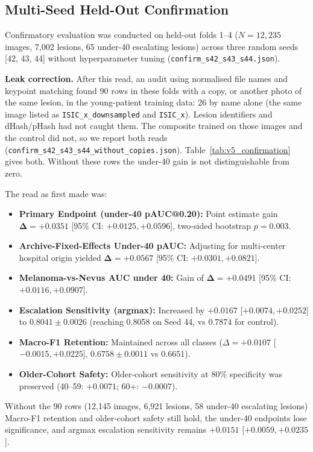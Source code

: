 \documentclass[journal]{IEEEtran}
\newcommand{\uforty}{under-40}
\begin{document}
\subsection{Multi-Seed Held-Out Confirmation}\label{sec:confirmation}
Confirmatory evaluation was conducted on held-out folds 1--4 ($N = 12,235$ images, 7,002 lesions, 65 \uforty{} escalating lesions) across three random seeds [42, 43, 44] without hyperparameter tuning (\texttt{confirm\_s42\_s43\_s44.json}).

\textbf{Leak correction.} After this read, an audit using normalised file names and keypoint matching found 90 rows in these folds with a copy, or another photo of the same lesion, in the young-patient training data: 26 by name alone (the same image listed as \texttt{ISIC\_x\_downsampled} and \texttt{ISIC\_x}). Lesion identifiers and dHash/pHash had not caught them. The composite trained on those images and the control did not, so we report both reads (\texttt{confirm\_s42\_s43\_s44\_without\_copies.json}). Table~\ref{tab:v5_confirmation} gives both. Without these rows the \uforty{} gain is not distinguishable from zero.

The read as first made was:
\begin{itemize}
\item \textbf{Primary Endpoint (\uforty{} pAUC@0.20):} Point estimate gain $\mathbf{\Delta = +0.0351}$ [95\% CI: $+0.0125, +0.0596$], two-sided bootstrap $p = 0.003$.
\item \textbf{Archive-Fixed-Effects Under-40 pAUC:} Adjusting for multi-center hospital origin yielded $\mathbf{\Delta = +0.0567}$ [95\% CI: $+0.0301, +0.0821$].
\item \textbf{Melanoma-vs-Nevus AUC under 40:} Gain of $\mathbf{\Delta = +0.0491}$ [95\% CI: $+0.0116, +0.0907$].
\item \textbf{Escalation Sensitivity (argmax):} Increased by $+0.0167$ [$+0.0074, +0.0252$] to $0.8041 \pm 0.0026$ (reaching 0.8058 on Seed 44, vs $0.7874$ for control).
\item \textbf{Macro-F1 Retention:} Maintained across all classes ($\Delta = +0.0107$ [$-0.0015, +0.0225$], $0.6758 \pm 0.0011$ vs $0.6651$).
\item \textbf{Older-Cohort Safety:} Older-cohort sensitivity at 80\% specificity was preserved (40--59: $+0.0071$; 60+: $-0.0007$).
\end{itemize}
Without the 90 rows (12,145 images, 6,921 lesions, 58 \uforty{} escalating lesions) Macro-F1 retention and older-cohort safety still hold, the \uforty{} endpoints lose significance, and argmax escalation sensitivity remains $+0.0151$ [$+0.0059, +0.0235$].
\end{document}

